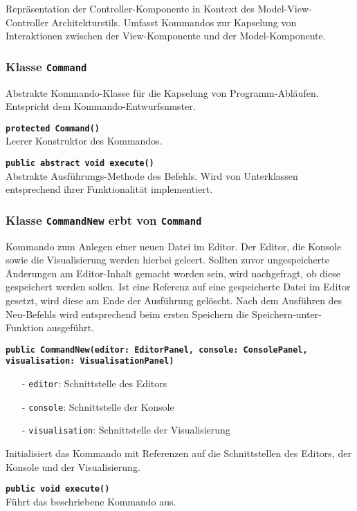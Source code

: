 \documentclass[parskip=full,11pt,twoside]{scrartcl}
\begin{document}
Repräsentation der Controller-Komponente in Kontext des Model-View-Controller Architekturstils. Umfasst Kommandos zur Kapselung von Interaktionen zwischen der View-Komponente und der Model-Komponente.

\subsubsection{Klasse \texttt{Command}}
Abstrakte Kommando-Klasse für die Kapselung von Programm-Abläufen. Entspricht dem Kommando-Entwurfsmuster.

\textbf{\texttt{protected Command()}}\\
Leerer Konstruktor des Kommandos.

\textbf{\texttt{public abstract void execute()}}\\
Abstrakte Ausführungs-Methode des Befehls. Wird von Unterklassen entsprechend ihrer Funktionalität implementiert.

\subsubsection{Klasse \texttt{CommandNew} erbt von \texttt{Command}}
Kommando zum Anlegen einer neuen Datei im Editor. Der Editor, die Konsole sowie die Visualisierung werden hierbei geleert. Sollten zuvor ungespeicherte Änderungen am Editor-Inhalt gemacht worden sein, wird nachgefragt, ob diese gespeichert werden sollen. Ist eine Referenz auf eine gespeicherte Datei im Editor gesetzt, wird diese am Ende der Ausführung gelöscht. Nach dem Ausführen des Neu-Befehls wird entsprechend beim ersten Speichern die Speichern-unter-Funktion ausgeführt.

\textbf{\texttt{public CommandNew(editor: EditorPanel, console: ConsolePanel,\\visualisation: VisualisationPanel)}}\\
\begin{itemize}[noitemsep]
	\item[-] \texttt{editor}: Schnittstelle des Editors
	\item[-] \texttt{console}: Schnittstelle der Konsole
	\item[-] \texttt{visualisation}: Schnittstelle der Visualisierung
\end{itemize}
Initialisiert das Kommando mit Referenzen auf die Schnittstellen des Editors, der Konsole und der Visualisierung.

\textbf{\texttt{public void execute()}}\\
Führt das beschriebene Kommando aus.
\end{document}
